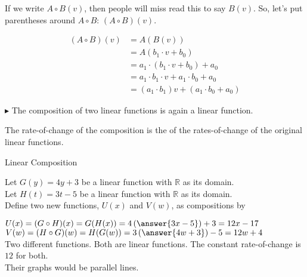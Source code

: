 \documentclass{ximera}
\begin{document}
If we write $A \circ B(v)$, then people will miss read this to say $B(v)$.  So, let's put parentheses around $A \circ B$: $(A \circ B)(v)$.







\begin{align*}
(A \circ B)(v) & = A(B(v)) \\
& = A(b_1 \cdot v + b_0)  \\
& = a_1 \cdot (b_1 \cdot v + b_0) + a_0  \\
& = a_1 \cdot b_1 \cdot v + a_1 \cdot b_0 + a_0    \\
& = (a_1 \cdot b_1) v + (a_1 \cdot b_0 + a_0)
\end{align*}






$\blacktriangleright$ The composition of two linear functions is again a linear function.

The rate-of-change of the composition is the  of the rates-of-change of the original linear functions.





\begin{example} Linear Composition

Let $G(y) = 4 y + 3$ be a linear function with $\mathbb{R}$ as its domain. \\
Let $H(t) = 3 t -5$ be a linear function with $\mathbb{R}$ as its domain. \\


Define two new functions, $U(x)$ and $V(w)$, as compositions by

$U(x) = (G \circ H)(x) = G(H(x)) = 4 \left(\answer{3 x - 5}\right) + 3 = 12 x -17$ \\
$V(w) = (H \circ G)(w) =H(G(w)) = 3 \left(\answer{4 w + 3}\right) - 5 = 12 w + 4$ \\


Two different functions. Both are linear functions. The constant rate-of-change is $12$ for both. \\

Their graphs would be parallel lines. \\


\end{example}
\end{document}
